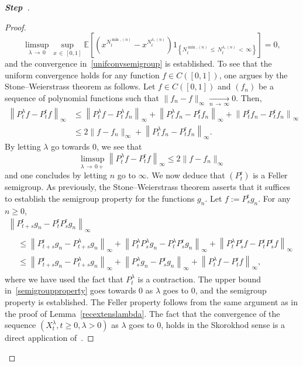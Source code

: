 \documentclass[10pt]{amsart}
\theoremstyle{definition}\newtheorem{defi}[theo]{Definition}\newtheorem{rema}[theo]{Remark}\newtheorem{exam}[theo]{Example}\newtheorem{exem}[theo]{Example}\newtheorem{nota}[theo]{Notation}
\newcommand{\rmr}{\mathrm{r}}
\newcommand{\bbE}{\mathbb{E}}
\newcounter{stepcount}
\newenvironment{step}{\refstepcounter{stepcount}\begin{proof}[\textbf{Step~\thestepcount}]}{\end{proof}}
\begin{document}
\begin{step}
\begin{proof}
\[
\underset{\lambda\,\rightarrow\,0}{\limsup} \underset{x\,\in\,[0,1]}{\sup}\bbE\left[\left(x^{N^{\min,(n)}_{t}}-x^{N_t^{\lambda,(n)}}\right)1_{\left\{N_t^{\min,(n)}\,\leq\,N_t^{\lambda,(n)}\,<\,\infty\right\}}\right]=0,
\]
and the convergence in~\eqref{unifconvsemigroup} is established. To see that the uniform convergence holds for any function $f\in C([0,1])$, one argues by the Stone--Weierstrass theorem as follows. Let $f\in C([0,1])$ and $(f_n)$ be a sequence of polynomial functions such that $\|f_n-f\|_\infty\underset{n\,\rightarrow\,\infty}{\longrightarrow} 0$. Then,
\begin{align*}
\left\|P_t^{\lambda}f-P_t^{\rmr}f\right\|_\infty &\leq \left\|P_t^{\lambda}f-P_t^{\lambda}f_n\right\|_\infty+\left\|P_t^{\lambda}f_n-P_t^{\rmr}f_n\right\|_\infty+\left\|P_t^{\rmr}f_n-P_t^{\rmr}f_n\right\|_\infty\\
&\leq 2\|f-f_n\|_\infty+\left\|P_t^{\lambda}f_n-P_t^{\rmr}f_n\right\|_\infty.
\end{align*}
By letting $\lambda$ go towards $0$, we see that
\[
\underset{\lambda\,\rightarrow\,0+}{\limsup} \left\|P_t^{\lambda}f-P_t^{\rmr}f\right\|_\infty\leq 2\|f-f_n\|_\infty
\]
and one concludes by letting $n$ go to $\infty$. We now deduce that $(P_t^{\rmr})$ is a Feller semigroup. As previously, the Stone--Weierstrass theorem asserts that it suffices to establish the semigroup property for the functions $g_n$. Let $f:=P_s^{\rmr}g_n$. For any $n\geq 0$,
\begin{multline}\label{semigroupproperty}
\left\|P_{t+s}^{\rmr}g_n-P_{t}^{\rmr}P_{s}^{\rmr}g_n\right\|_\infty \\
\begin{aligned}
&\leq \left\|P_{t+s}^{\rmr}g_n-P_{t+s}^{\lambda}g_n\right\|_\infty +\left\|P_{t}^{\lambda}P_{s}^{\lambda}g_n-P_{t}^{\lambda}P_{s}^{\rmr}g_n\right\|_\infty+\left\|P_{t}^{\lambda}P_s^{\rmr}f-P_{t}^{\rmr}P_s^{\rmr}f\right\|_\infty \\
&\leq \left\|P_{t+s}^{\rmr}g_n-P_{t+s}^{\lambda}g_n\right\|_\infty+\left\|P_{s}^{\lambda}g_n-P_{s}^{\rmr}g_n\right\|_\infty+\left\|P_{t}^{\lambda}f-P_{t}^{\rmr}f\right\|_\infty,
\end{aligned}
\end{multline}
where we have used the fact that $P_t^{\lambda} $ is a contraction. The upper bound in~\eqref{semigroupproperty} goes towards $0$ as $\lambda$ goes to $0$, and the semigroup property is established. The Feller property follows from the same argument as in the proof of Lemma~\ref{recextenslambda}. The fact that the convergence of the sequence $(X_t^{\lambda},t\geq 0,\lambda>0)$ as $\lambda$ goes to $0$, holds in the Skorokhod sense is a direct application of~\cite[Theorem~2.5 page~167]{EthierKurtz}.


\end{proof}
\end{step}
\end{document}
